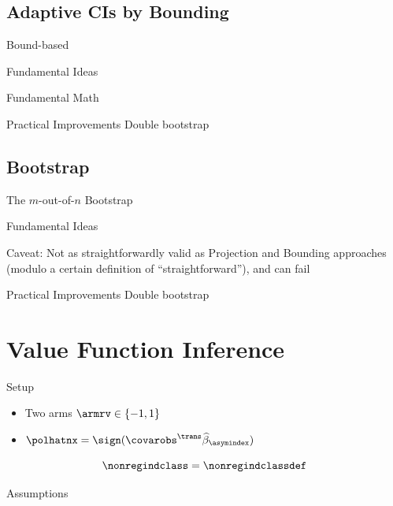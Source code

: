 \documentclass[aspectratio=169, professionalfonts]{beamer}
\begin{document}
\subsection{Adaptive CIs by Bounding}
\begin{frame}{Bound-based}
\end{frame}
\begin{frame}{Fundamental Ideas}
\end{frame}
\begin{frame}{Fundamental Math}
\end{frame}
\begin{frame}{Practical Improvements}
	Double bootstrap
\end{frame}

\subsection{\mon Bootstrap}
\begin{frame}{The $m$-out-of-$n$ Bootstrap}
\end{frame}
\begin{frame}{Fundamental Ideas}

	Caveat: Not as straightforwardly valid as Projection and Bounding approaches
	(modulo a certain definition of ``straightforward''), and can fail
	\autocite{andrews2010Asymptotic}
\end{frame}
\begin{frame}{Practical Improvements}
	Double bootstrap
\end{frame}


\section{Value Function Inference}
\begin{frame}{Setup}
	\begin{itemize}
		\item	Two arms $\armrv \in \{-1, 1\}$
		\item $\polhatnx = \sign(\covarobs^{\trans}\widehat{\beta}_{\asymindex})$
	\end{itemize}

	\begin{displaymath}
		\nonregindclass = \nonregindclassdef
	\end{displaymath}
\end{frame}

\begin{frame}{Assumptions}
\end{frame}
\end{document}
